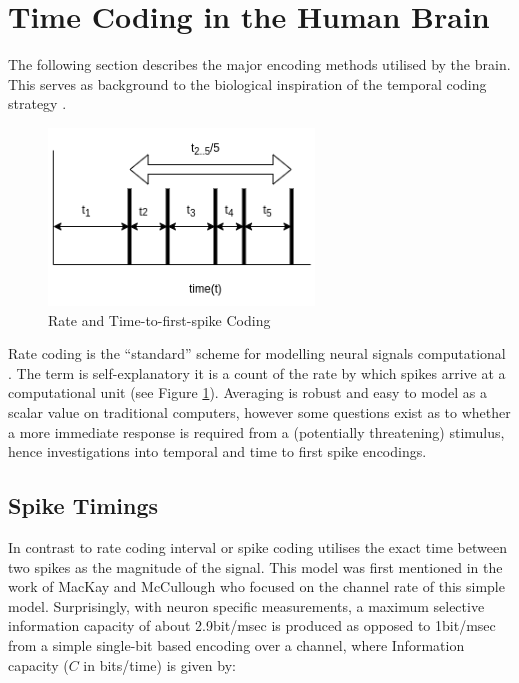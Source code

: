 \documentclass{article}
\begin{document}
\section{Time Coding in the Human Brain} \label{app:brain}

The following section describes the major encoding methods utilised by the brain. This serves as background to the biological inspiration of the temporal coding strategy \cite{victor2000brain}.

\begin{figure}[ht]
  \centering
  \includegraphics[width=200pt]{figures/rate.png}
  \caption{Rate and Time-to-first-spike Coding}
  \label{fig:rate}
\end{figure}

Rate coding is the ``standard'' scheme for modelling neural signals computational \cite{rosenblatt1958perceptron}. The term is self-explanatory it is a count of the rate by which spikes arrive at a computational unit (see Figure \ref{fig:rate}). Averaging is robust and easy to model as a scalar value on traditional computers, however some questions exist as to whether a more immediate response is required from a (potentially threatening) stimulus, hence investigations into temporal and time to first spike encodings. 

\subsection{Spike Timings}

In contrast to rate coding interval or spike coding utilises the exact time between two spikes as the magnitude of the signal. This model was first mentioned in the work of MacKay and McCullough \cite{MacKay1952} who focused on the channel rate of this simple model. Surprisingly, with neuron specific measurements, a maximum selective information capacity of about 2.9bit/msec is produced as opposed to 1bit/msec from a simple single-bit based encoding over a channel, where Information capacity ($C$ in bits/time) is given by:
\end{document}
